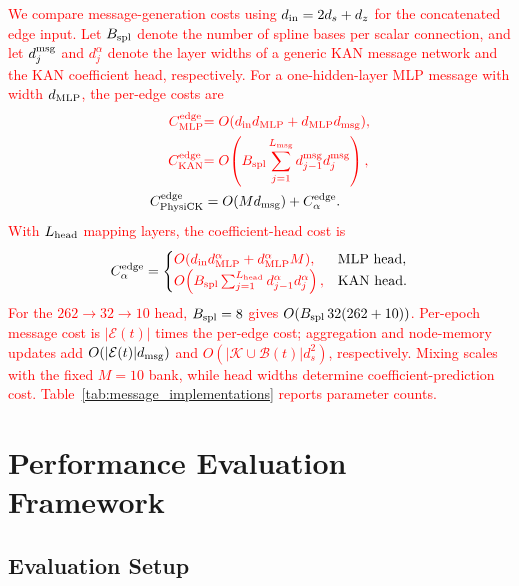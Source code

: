 \documentclass[10pt,letterpaper,journal]{IEEEtran}
\newcommand{\revnew}[1]{\textcolor{red}{#1}}
\begin{document}
\revnew{We compare message-generation costs using $d_{\rm in}=2d_s+d_z$ for the concatenated edge input. Let $B_{\rm spl}$ denote the number of spline bases per scalar connection, and let $d_j^{\rm msg}$ and $d_j^\alpha$ denote the layer widths of a generic KAN message network and the KAN coefficient head, respectively. For a one-hidden-layer MLP message with width $d_{\rm MLP}$, the per-edge costs are}
\begin{equation}
\begin{aligned}
\revnew{C^{\rm edge}_{\rm MLP}}&\revnew{=O(d_{\rm in}d_{\rm MLP}+d_{\rm MLP}d_{\rm msg}),}\\
\revnew{C^{\rm edge}_{\rm KAN}}&\revnew{=O\!\left(B_{\rm spl}\sum_{j=1}^{L_{\rm msg}}d_{j-1}^{\rm msg}d_j^{\rm msg}\right),}\\
C^{\rm edge}_{\rm PhysiCK}&=O(Md_{\rm msg})+C^{\rm edge}_\alpha.
\end{aligned}
\label{eq:cost_all}
\end{equation}
\revnew{With $L_{\rm head}$ mapping layers, the coefficient-head cost is}
\begin{equation}
C^{\rm edge}_\alpha=
\begin{cases}
\revnew{O(d_{\rm in}d^\alpha_{\rm MLP}+d^\alpha_{\rm MLP}M),} & \text{MLP head},\\
\revnew{O\!\left(B_{\rm spl}\sum_{j=1}^{L_{\rm head}}d_{j-1}^\alpha d_j^\alpha\right),} & \text{KAN head}.
\end{cases}
\label{eq:cost_alpha}
\end{equation}
\revnew{For the $262\to32\to10$ head, $B_{\rm spl}=8$ gives $O(B_{\rm spl}\,32(262+10))$. Per-epoch message cost is $|\mathcal E(t)|$ times the per-edge cost; aggregation and node-memory updates add $O(|\mathcal E(t)|d_{\rm msg})$ and $O(|\mathcal K\cup\mathcal B(t)|d_s^2)$, respectively. Mixing scales with the fixed $M=10$ bank, while head widths determine coefficient-prediction cost. Table~\ref{tab:message_implementations} reports parameter counts.}



\section{Performance Evaluation Framework}
\label{EvaluationFramework}

\subsection{Evaluation Setup}
\label{setup}
\end{document}
